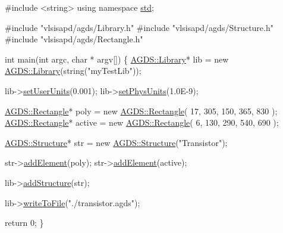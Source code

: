 \begin{DoxyCodeInclude}
\textcolor{preprocessor}{#include <string>}
\textcolor{keyword}{using namespace }\hyperlink{namespacestd}{std};

\textcolor{preprocessor}{#include "vlsisapd/agds/Library.h"}
\textcolor{preprocessor}{#include "vlsisapd/agds/Structure.h"}
\textcolor{preprocessor}{#include "vlsisapd/agds/Rectangle.h"}

\textcolor{keywordtype}{int} main(\textcolor{keywordtype}{int} argc, \textcolor{keywordtype}{char} * argv[]) \{
    \hyperlink{class_a_g_d_s_1_1_library}{AGDS::Library}* lib = \textcolor{keyword}{new} \hyperlink{class_a_g_d_s_1_1_library}{AGDS::Library}(\textcolor{keywordtype}{string}(\textcolor{stringliteral}{"myTestLib"}));

    lib->\hyperlink{class_a_g_d_s_1_1_library_a0d0e972bb142f892c462bb8d7f04a50b}{setUserUnits}(0.001);
    lib->\hyperlink{class_a_g_d_s_1_1_library_a938acb6eb8d14aade9dba7331c75ff0a}{setPhysUnits}(1.0E-9);

    \hyperlink{class_a_g_d_s_1_1_rectangle}{AGDS::Rectangle}* poly   = \textcolor{keyword}{new} \hyperlink{class_a_g_d_s_1_1_rectangle}{AGDS::Rectangle}( 17, 305, 150, 365, 830 );
    \hyperlink{class_a_g_d_s_1_1_rectangle}{AGDS::Rectangle}* active = \textcolor{keyword}{new} \hyperlink{class_a_g_d_s_1_1_rectangle}{AGDS::Rectangle}(  6, 130, 290, 540, 690 );

    \hyperlink{class_a_g_d_s_1_1_structure}{AGDS::Structure}* str = \textcolor{keyword}{new} \hyperlink{class_a_g_d_s_1_1_structure}{AGDS::Structure}(\textcolor{stringliteral}{"Transistor"});

    str->\hyperlink{class_a_g_d_s_1_1_structure_a2dd203e6770f7d15d6f706867c919a60}{addElement}(poly);
    str->\hyperlink{class_a_g_d_s_1_1_structure_a2dd203e6770f7d15d6f706867c919a60}{addElement}(active);

    lib->\hyperlink{class_a_g_d_s_1_1_library_a93d333a20154e0b688ff3ff213039171}{addStructure}(str);

    lib->\hyperlink{class_a_g_d_s_1_1_library_a33b9d989b84857f46034085664ff3fa2}{writeToFile}(\textcolor{stringliteral}{"./transistor.agds"});
    
    \textcolor{keywordflow}{return} 0;
\}

\end{DoxyCodeInclude}


